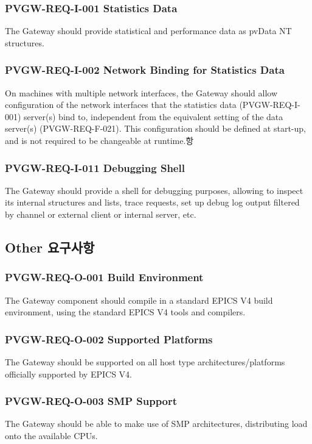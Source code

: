 \documentclass[11pt
  , a4paper
  , article
  , oneside
]{memoir}
\begin{document}
\subsubsection{PVGW-REQ-I-001 Statistics Data}
The Gateway should provide statistical and performance data as pvData NT structures.

\subsubsection{PVGW-REQ-I-002 Network Binding for Statistics Data}
On machines with multiple network interfaces, the Gateway should allow configuration of the network interfaces that the statistics data (PVGW-REQ-I-001) server(s) bind to, independent from the equivalent setting of the data server(s) (PVGW-REQ-F-021). This configuration should be defined at start-up, and is not required to be changeable at runtime.항
\subsubsection{PVGW-REQ-I-011 Debugging Shell}
The Gateway should provide a shell for debugging purposes, allowing to inspect its internal structures and lists, trace requests, set up debug log output filtered by channel or external client or internal server, etc.

\subsection{Other 요구사항}
\subsubsection{PVGW-REQ-O-001 Build Environment}
The Gateway component should compile in a standard EPICS V4 build environment, using the standard EPICS V4 tools and compilers.

\subsubsection{PVGW-REQ-O-002 Supported Platforms}
The Gateway should be supported on all host type architectures/platforms officially supported by EPICS V4.

\subsubsection{PVGW-REQ-O-003 SMP Support}
The Gateway should be able to make use of SMP architectures, distributing load onto the available CPUs.
\end{document}
